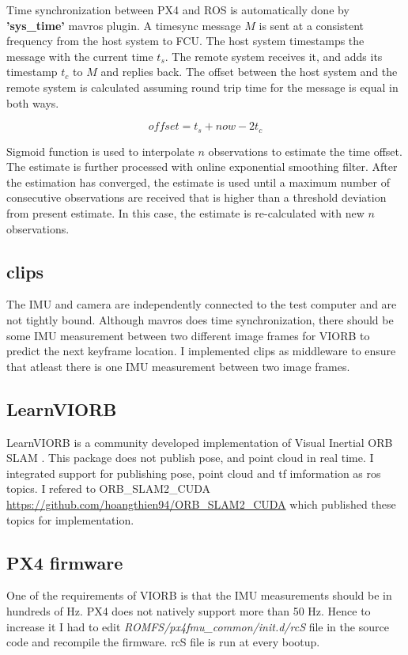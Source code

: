 Time synchronization between PX4 and ROS is automatically done by \textbf{'sys\_time'} mavros plugin.
A timesync message $M$ is sent at a consistent frequency from the host system to FCU. The host system timestamps the message with the current time $t_s$. The remote system receives it, and adds its timestamp $t_c$ to $M$ and replies back.
The offset between the host system and the remote system is calculated assuming round trip time for the message is equal in both ways.

\begin{equation}
offset = t_s + now - 2t_c
\end{equation}

Sigmoid function is used to interpolate $n$ observations to estimate the time offset. The estimate is further processed with online exponential smoothing filter.
After the estimation has converged, the estimate is used until a maximum number of consecutive observations are received that is higher than a threshold deviation from present estimate. In this case, the estimate is re-calculated with new $n$ observations.

\subsection{clips}
The IMU and camera are independently connected to the test computer and are not tightly bound. Although mavros does time synchronization, there should be some IMU measurement between two different image frames for VIORB to predict the next keyframe location. 
I implemented clips as middleware to ensure that atleast there is one IMU measurement between two image frames.

\subsection{LearnVIORB}
LearnVIORB is a community developed implementation of Visual Inertial ORB SLAM . This package does not publish pose, and point cloud in real time. I integrated support for publishing pose, point cloud and tf imformation as ros topics. 
I refered to ORB\_SLAM2\_CUDA    \url{https://github.com/hoangthien94/ORB\_SLAM2\_CUDA} which published these topics for implementation.

\subsection{PX4 firmware}
One of the requirements of VIORB is that the IMU measurements should be in hundreds of Hz. PX4 does not natively support more than 50 Hz. Hence to increase it I had to edit \textit{ROMFS/px4fmu\_common/init.d/rcS} file in the source code and recompile the firmware.
rcS file is run at every bootup.

